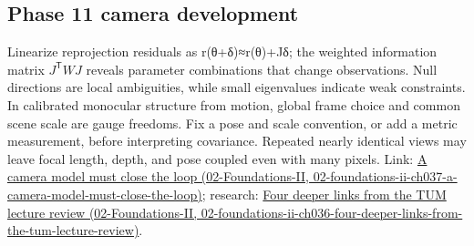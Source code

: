\subsection{Phase 11 camera development}\label{appendix-3ee9861904d5-phase-11-camera-development}

Linearize reprojection residuals as r(θ+δ)≈r(θ)+Jδ; the weighted information matrix \(J^{\mathsf T}WJ\) reveals parameter combinations that change observations. Null directions are local ambiguities, while small eigenvalues indicate weak constraints. In calibrated monocular structure from motion, global frame choice and common scene scale are gauge freedoms. Fix a pose and scale convention, or add a metric measurement, before interpreting covariance. Repeated nearly identical views may leave focal length, depth, and pose coupled even with many pixels. Link: \href{../02-Foundations-II/main.pdf\#nameddest=02-foundations-ii-ch037-a-camera-model-must-close-the-loop}{A camera model must close the loop (02-Foundations-II, 02-foundations-ii-ch037-a-camera-model-must-close-the-loop)}; research: \href{../02-Foundations-II/main.pdf\#nameddest=02-foundations-ii-ch036-four-deeper-links-from-the-tum-lecture-review}{Four deeper links from the TUM lecture review (02-Foundations-II, 02-foundations-ii-ch036-four-deeper-links-from-the-tum-lecture-review)}.
